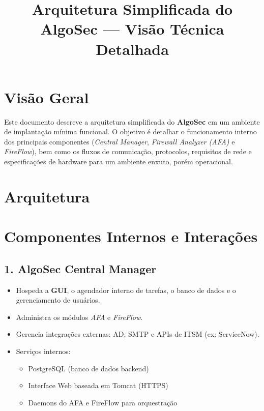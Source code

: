 \documentclass[a4paper,12pt]{article}
\title{\textbf{Arquitetura Simplificada do AlgoSec — Visão Técnica Detalhada}}
\author{}
\date{}
\begin{document}
\maketitle

\section*{Visão Geral}
Este documento descreve a arquitetura simplificada do \textbf{AlgoSec} em um ambiente de implantação mínima funcional.  
O objetivo é detalhar o funcionamento interno dos principais componentes (\textit{Central Manager}, \textit{Firewall Analyzer (AFA)} e \textit{FireFlow}), bem como os fluxos de comunicação, protocolos, requisitos de rede e especificações de hardware para um ambiente enxuto, porém operacional.
\usetikzlibrary{shapes, arrows, positioning}

\section*{Arquitetura}


\section*{Componentes Internos e Interações}

\subsection*{1. AlgoSec Central Manager}
\begin{itemize}[leftmargin=1.5cm]
    \item Hospeda a \textbf{GUI}, o agendador interno de tarefas, o banco de dados e o gerenciamento de usuários.
    \item Administra os módulos \textit{AFA} e \textit{FireFlow}.
    \item Gerencia integrações externas: AD, SMTP e APIs de ITSM (ex: ServiceNow).
    \item Serviços internos:
    \begin{itemize}
        \item PostgreSQL (banco de dados backend)
        \item Interface Web baseada em Tomcat (HTTPS)
        \item Daemons do AFA e FireFlow para orquestração
    \end{itemize}
\end{itemize}
\end{document}
